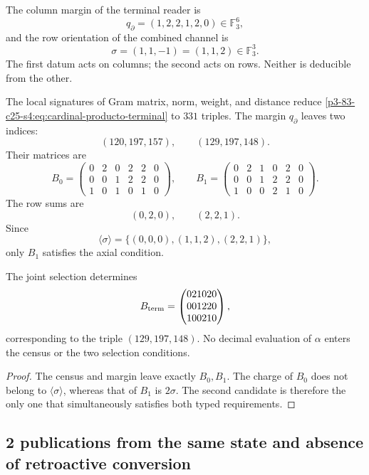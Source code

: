 The column margin of the terminal reader is
\[
 q_\partial=(1,2,2,1,2,0)\in\mathbb F_3^6,
\]
and the row orientation of the combined channel is
\[
 \sigma=(1,1,-1)=(1,1,2)\in\mathbb F_3^3.
\]
The first datum acts on columns; the second acts on rows. Neither is deducible from the other.

The local signatures of Gram matrix, norm, weight, and distance reduce
\eqref{p3-83-c25-s4:eq:cardinal-producto-terminal} to \(331\) triples. The margin
\(q_\partial\) leaves two indices:
\[
 (120,197,157),
 \qquad
 (129,197,148).
\]
Their matrices are
\[
 B_0=
 \begin{pmatrix}
 0&2&0&2&2&0\\
 0&0&1&2&2&0\\
 1&0&1&0&1&0
 \end{pmatrix},
 \qquad
 B_1=
 \begin{pmatrix}
 0&2&1&0&2&0\\
 0&0&1&2&2&0\\
 1&0&0&2&1&0
 \end{pmatrix}.
\]
The row sums are
\[
 (0,2,0),
 \qquad
 (2,2,1).
\]
Since
\[
 \langle\sigma\rangle
 =\{(0,0,0),(1,1,2),(2,2,1)\},
\]
only \(B_1\) satisfies the axial condition.

\begin{theorem}
\label{p3-83-c25-s4:thm:unicidad-publicacion-terminal-visible}
The joint selection determines
\begin{equation}
 B_{\rm term}=
 \begin{pmatrix}
 021020\\001220\\100210
 \end{pmatrix},
 \label{p3-83-c25-s4:eq:matriz-terminal-visible}
\end{equation}
corresponding to the triple \((129,197,148)\). No decimal evaluation of
\(\alpha\) enters the census or the two selection conditions.
\end{theorem}

\begin{proof}
The census and margin leave exactly \(B_0,B_1\). The charge of \(B_0\)
does not belong to \(\langle\sigma\rangle\), whereas that of \(B_1\) is
\(2\sigma\). The second candidate is therefore the only one that simultaneously satisfies
both typed requirements.
\end{proof}

\subsection{2 publications from the same state and absence of retroactive conversion}

